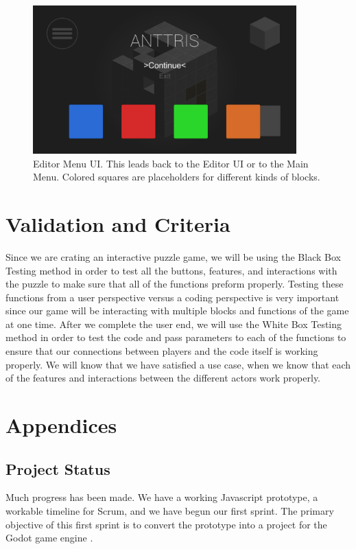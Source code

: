 \documentclass[12pt]{article}
\begin{document}
    \begin{figure}[H]
        \centering
        \includegraphics[width=4in]{EditorMenuUI.png}
        \caption{Editor Menu UI. This leads back to the Editor UI or to the Main Menu. Colored squares are placeholders for different kinds of blocks. }
    \end{figure}

\section{Validation and Criteria}\label{validation-BC}
 Since we are crating an interactive puzzle game, we will be using the Black Box Testing method in order to test all the buttons, features, and interactions with the puzzle to make sure that all of the functions preform properly. 
 Testing these functions from a user perspective versus a coding perspective is very important since our game will be interacting with multiple blocks and functions of the game at one time. 
 After we complete the user end, we will use the White Box Testing method in order to test the code and pass parameters to each of the functions to ensure that our connections between players and the code itself is working properly. 
 We will know that we have satisfied a use case, when we know that each of the features and interactions between the different actors work properly.
\section{Appendices}

\subsection{Project Status}\label{status-ST}

Much progress has been made. We have a working Javascript prototype, a
workable timeline for Scrum, and we have begun our first sprint. The
primary objective of this first sprint is to convert the prototype
into a project for the Godot game engine \cite{godot:gameengine}.
\end{document}
